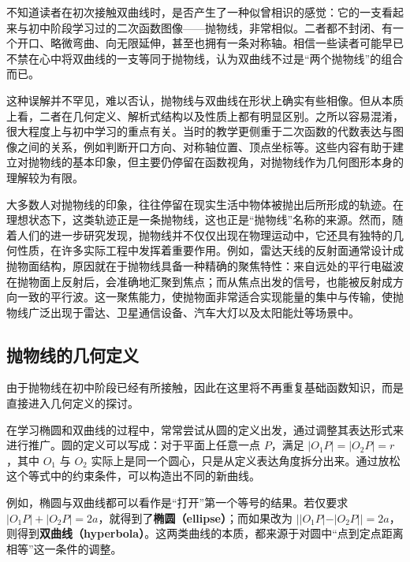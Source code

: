 
\begin{issues}
\issueDraft
\end{issues}


不知道读者在初次接触双曲线时，是否产生了一种似曾相识的感觉：它的一支看起来与初中阶段学习过的二次函数图像——抛物线，非常相似。二者都不封闭、有一个开口、略微弯曲、向无限延伸，甚至也拥有一条对称轴。相信一些读者可能早已不禁在心中将双曲线的一支等同于抛物线，认为双曲线不过是“两个抛物线”的组合而已。

这种误解并不罕见，难以否认，抛物线与双曲线在形状上确实有些相像。但从本质上看，二者在几何定义、解析式结构以及性质上都有明显区别。之所以容易混淆，很大程度上与初中学习的重点有关。当时的教学更侧重于二次函数的代数表达与图像之间的关系，例如判断开口方向、对称轴位置、顶点坐标等。这些内容有助于建立对抛物线的基本印象，但主要仍停留在函数视角，对抛物线作为几何图形本身的理解较为有限。

大多数人对抛物线的印象，往往停留在现实生活中物体被抛出后所形成的轨迹。在理想状态下，这类轨迹正是一条抛物线，这也正是“抛物线”名称的来源。然而，随着人们的进一步研究发现，抛物线并不仅仅出现在物理运动中，它还具有独特的几何性质，在许多实际工程中发挥着重要作用。例如，雷达天线的反射面通常设计成抛物面结构，原因就在于抛物线具备一种精确的聚焦特性：来自远处的平行电磁波在抛物面上反射后，会准确地汇聚到焦点；而从焦点出发的信号，也能被反射成方向一致的平行波。这一聚焦能力，使抛物面非常适合实现能量的集中与传输，使抛物线广泛出现于雷达、卫星通信设备、汽车大灯以及太阳能灶等场景中。





\subsection{抛物线的几何定义}

由于抛物线在初中阶段已经有所接触，因此在这里将不再重复基础函数知识，而是直接进入几何定义的探讨。

在学习椭圆和双曲线的过程中，常常尝试从圆的定义出发，通过调整其表达形式来进行推广。圆的定义可以写成：对于平面上任意一点 $P$，满足 $|O_1P| = |O_2P| = r$，其中 $O_1$ 与 $O_2$ 实际上是同一个圆心，只是从定义表达角度拆分出来。通过放松这个等式中的约束条件，可以构造出不同的新曲线。

例如，椭圆与双曲线都可以看作是“打开”第一个等号的结果。若仅要求 $|O_1P| + |O_2P| = 2a$，就得到了\textbf{椭圆（ellipse）}；而如果改为 $||O_1P| - |O_2P|| = 2a$，则得到\textbf{双曲线（hyperbola）}。这两类曲线的本质，都来源于对圆中“点到定点距离相等”这一条件的调整。

